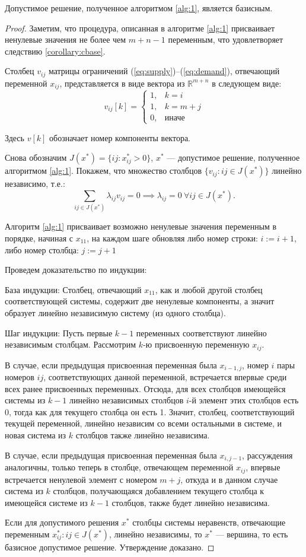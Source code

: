 \documentclass[12pt]{article}
\theoremstyle{definition}
\theoremstyle{plain}
\theoremstyle{definition}
\begin{document}
\begin{assertionlocal}
Допустимое решение, полученное алгоритмом \ref{alg:1}, является базисным.
\end{assertionlocal}
\begin{proof}
Заметим, что процедура, описанная в алгоритме \ref{alg:1} присваивает ненулевые значения
не более чем $m+n-1$ переменным, что удовлетворяет следствию \ref{corollary:cbase}.

Столбец $v_{ij}$ матрицы ограничений (\ref{eq:supply})--(\ref{eq:demand}), отвечающий переменной $x_{ij}$,
представляется в виде вектора из $\mathbb{R}^{m+n}$ в следующем виде:
\[
v_{ij}[k] =
\begin{cases}
1, & k=i\\
1, & k=m+j\\
0, & \text{иначе}
\end{cases}
\]

Здесь $v[k]$ обозначает номер компоненты вектора.

Снова обозначим $J(x^*) = \{ij : x^*_{ij} > 0\}$, $x^*$ ---
допустимое решение, полученное алгоритмом \ref{alg:1}.
Покажем, что множество столбцов $\{v_{ij} : ij\in J(x^*)\}$ линейно независимо, т.е.:
\[
\sum_{ij \in J(x^*)} \lambda_{ij} v_{ij} = 0 \implies \lambda_{ij} = 0 \ \forall ij \in J(x^*).
\]

Алгоритм \ref{alg:1} присваивает возможно ненулевые значения переменным в порядке,
начиная с $x_{11}$, на каждом шаге обновляя либо номер строки: $i := i+1$, либо номер столбца: $j := j+1$

Проведем доказательство по индукции:

База индукции: Столбец, отвечающий $x_{11}$, как и любой другой столбец соответствующей системы,
содержит две ненулевые компоненты, а значит образует линейно независимую систему (из одного столбца).  

Шаг индукции: Пусть первые $k-1$ переменных соответствуют линейно независимым столбцам.
Рассмотрим $k$-ю присвоенную переменную $x_{ij}$.

В случае, если предыдущая присвоенная переменная была $x_{i-1,j}$, номер $i$ пары номеров $ij$,
соответствующих данной переменной, встречается впервые среди всех ранее присвоенных переменных.
Отсюда, для всех столбцов имеющейся системы из $k-1$ линейно независимых столбцов $i$-й
элемент этих столбцов есть 0, тогда как для текущего столбца он есть 1. Значит, столбец,
соответствующий текущей переменной, линейно независим
со всеми остальными в системе, и новая система из $k$ столбцов также линейно независима.

В случае, если предыдущая присвоенная переменная была $x_{i,j-1}$, рассуждения аналогичны,
только теперь в столбце, отвечающем переменной $x_{ij}$, впервые встречается ненулевой элемент
с номером $m + j$, откуда и в данном случае система из $k$ столбцов, получающаяся добавлением
текущего столбца к имеющейся системе из $k-1$ столбцов, также будет линейно независима.

Если для допустимого решения $x^*$ столбцы системы неравенств, отвечающие переменным
$x^*_{ij}: ij \in J(x^*)$, линейно независимы, то $x^*$ --- вершина, то есть базисное допустимое решение.
Утверждение доказано.
\end{proof}
\end{document}
